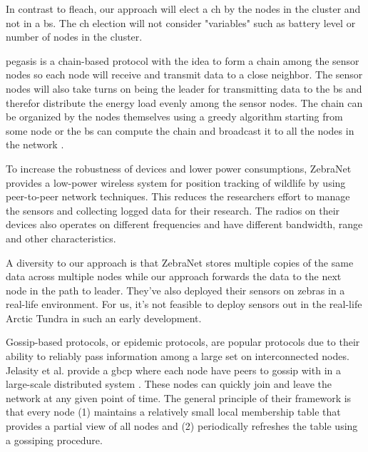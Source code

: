 \documentclass[USenglish]{uit-thesis}
\begin{document}
In contrast to \gls{fleach}, our approach will elect a \gls{ch} by the nodes in the cluster and not in a \gls{bs}. The \gls{ch} election will not consider "variables" such as battery level or number of nodes in the cluster.


\Gls{pegasis} is a chain-based protocol with the idea to form a chain among the sensor nodes so each node will receive and transmit data to a close neighbor. The sensor nodes will also take turns on being the leader for transmitting data to the \gls{bs} and therefor distribute the energy load evenly among the sensor nodes. The chain can be organized by the nodes themselves using a greedy algorithm starting from some node or the \gls{bs} can compute the chain and broadcast it to all the nodes in the network \cite{pegasis}.

To increase the robustness of devices and lower power consumptions, ZebraNet \cite{zebranet} provides a low-power wireless system for position tracking of wildlife by using peer-to-peer network techniques. This reduces the researchers effort to manage the sensors and collecting logged data for their research. The radios on their devices also operates on different frequencies and have different bandwidth, range and other characteristics.

A diversity to our approach is that ZebraNet stores multiple copies of the same data across multiple nodes while our approach forwards the data to the next node in the path to leader. They've also deployed their sensors on zebras in a real-life environment. For us, it's not feasible to deploy sensors out in the real-life Arctic Tundra in such an early development.







Gossip-based protocols, or epidemic protocols, are popular protocols due to their ability to reliably pass information among a large set on interconnected nodes. Jelasity et al. \cite{gbsampling} provide a \gls{gbcp} where each node have peers to gossip with in a large-scale distributed system \cite{demers}. These nodes can quickly join and leave the network at any given point of time. The general principle of their framework is that every node (1) maintains a relatively small local membership table that provides a partial view of all nodes and (2) periodically refreshes the table using a gossiping procedure.
\end{document}
